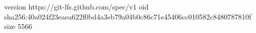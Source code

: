 version https://git-lfs.github.com/spec/v1
oid sha256:40a024f23eaea622f0bd4a3eb79a04b0c86c71e45406cc010582c8480787810f
size 5566
